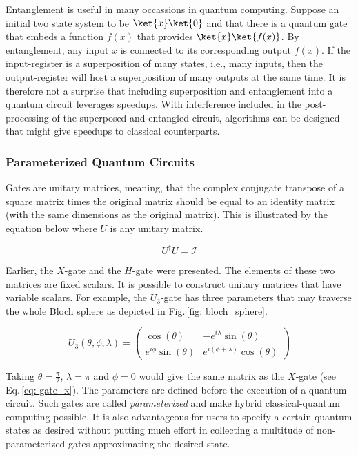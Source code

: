 \documentclass[../main.tex]{subfiles}
\begin{document}
Entanglement is useful in many occassions in quantum computing. Suppose an initial two state system to be $\ket{x}\ket{0}$ and that there is a quantum gate that embeds a function $f(x)$ that provides $\ket{x}\ket{f(x)}$. By entanglement, any input $x$ is connected to its corresponding output $f(x)$. If the input-register is a superposition of many states, i.e., many inputs, then the output-register will host a superposition of many outputs at the same time. It is therefore not a surprise that including superposition and entanglement into a quantum circuit leverages speedups. With interference included in the post-processing of the superposed and entangled circuit, algorithms can be designed that might give speedups to classical counterparts.

\subsubsection*{Parameterized Quantum Circuits}
Gates are unitary matrices, meaning, that the complex conjugate transpose of a square matrix times the original matrix should be equal to an identity matrix (with the same dimensions as the original matrix). This is illustrated by the equation below where $U$ is any unitary matrix.

\begin{equation}
    U^\dagger U = \mathcal{I}
\end{equation}

Earlier, the $X$-gate and the $H$-gate were presented. The elements of these two matrices are fixed scalars. It is possible to construct unitary matrices that have variable scalars. For example, the $U_3$-gate has three parameters that may traverse the whole Bloch sphere as depicted in Fig.\,\ref{fig: bloch_sphere}. 

\begin{equation}
    U_3(\theta, \phi, \lambda) =
    \begin{pmatrix}
        \cos(\theta)          & -e^{i\lambda}\sin(\theta) \\
        e^{i\phi}\sin(\theta) & e^{i(\phi+\lambda)}\cos(\theta)  
    \end{pmatrix}
\label{eq: u3-gate}
\end{equation}

Taking $\theta = \frac{\pi}{2}$, $\lambda = \pi$ and $\phi = 0$ would give the same matrix as the $X$-gate (see Eq.\,\ref{eq: gate_x}). The parameters are defined before the execution of a quantum circuit. Such gates are called \emph{parameterized} and make hybrid classical-quantum computing possible. It is also advantageous for users to specify a certain quantum states as desired without putting much effort in collecting a multitude of non-parameterized gates approximating the desired state.  
\end{document}
